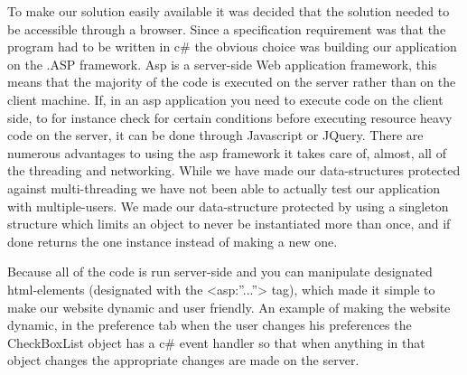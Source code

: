 To make our solution easily available it was decided that the solution needed to be accessible through a browser. Since a specification requirement was that the program had to be written in c\# the obvious choice was building our application on the .ASP framework. Asp is a server-side Web application framework, this means that the majority of the code is executed on the server rather than on the client machine. If, in an asp application you need to execute code on the client side, to for instance check for certain conditions before executing resource heavy code on the server, it can be done through Javascript or JQuery. There are numerous advantages to using the asp framework it takes care of, almost, all of the threading and networking. While we have made our data-structures protected against multi-threading we have not been able to actually test our application with multiple-users. We made our data-structure protected by using a singleton structure which limits an object to never be instantiated more than once, and if done returns the one instance instead of making a new one.

Because all of the code is run server-side and you can manipulate designated html-elements  (designated with the <asp:”...”> tag), which made it simple to make our website dynamic and user friendly. An example of making the website dynamic, in the preference tab when the user changes his preferences the CheckBoxList object has a c\# event handler so that when anything in that object changes the appropriate changes are made on the server.